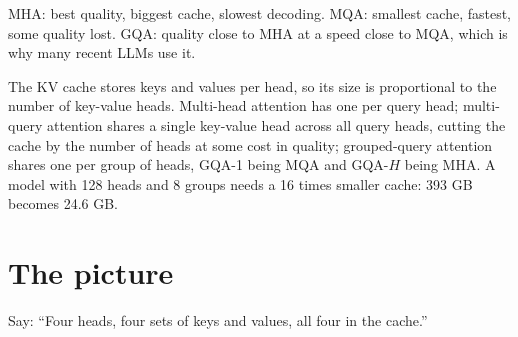 \begin{result}
MHA: best quality, biggest cache, slowest decoding. MQA: smallest cache, fastest, some quality lost. GQA: quality close to MHA at a speed close to MQA, which is why many recent LLMs use it.
\end{result}

\begin{sayit}
The KV cache stores keys and values per head, so its size is proportional to the number of key-value heads. Multi-head attention has one per query head; multi-query attention shares a single key-value head across all query heads, cutting the cache by the number of heads at some cost in quality; grouped-query attention shares one per group of heads, GQA-1 being MQA and GQA-$H$ being MHA. A model with 128 heads and 8 groups needs a 16 times smaller cache: 393 GB becomes 24.6 GB.
\end{sayit}

\section{The picture}

\begin{sayit}
\begin{pic}
\end{pic}
Say: ``Four heads, four sets of keys and values, all four in the cache.''
\end{sayit}

